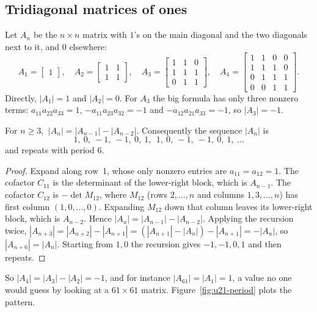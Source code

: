\subsection{Tridiagonal matrices of ones}

Let $A_n$ be the $n\times n$ matrix with $1$'s on the main diagonal and the two diagonals
next to it, and $0$ elsewhere:
\[
  A_1=\begin{bmatrix}1\end{bmatrix},\quad
  A_2=\begin{bmatrix}1&1\\1&1\end{bmatrix},\quad
  A_3=\begin{bmatrix}1&1&0\\1&1&1\\0&1&1\end{bmatrix},\quad
  A_4=\begin{bmatrix}1&1&0&0\\1&1&1&0\\0&1&1&1\\0&0&1&1\end{bmatrix}.
\]
Directly, $|A_1|=1$ and $|A_2|=0$. For $A_3$ the big formula has only three nonzero terms:
$a_{11}a_{22}a_{33}=1$, $-a_{11}a_{23}a_{32}=-1$ and $-a_{12}a_{21}a_{33}=-1$, so $|A_3|=-1$.

\begin{theorem}\label{thm:u21-tridiag}
For $n\ge 3$, $\ |A_n|=|A_{n-1}|-|A_{n-2}|$. Consequently the sequence $|A_n|$ is
\[
  1,\ 0,\ -1,\ -1,\ 0,\ 1,\ \ 1,\ 0,\ -1,\ -1,\ 0,\ 1,\ \dots
\]
and repeats with period $6$.
\end{theorem}

\begin{proof}
Expand along row~1, whose only nonzero entries are $a_{11}=a_{12}=1$. The cofactor $C_{11}$
is the determinant of the lower-right block, which is $A_{n-1}$. The cofactor $C_{12}$ is
$-\det M_{12}$, where $M_{12}$ (rows $2,\dots,n$ and columns $1,3,\dots,n$) has first column
$(1,0,\dots,0)$. Expanding $M_{12}$ down that column leaves its lower-right block, which is
$A_{n-2}$. Hence $|A_n|=|A_{n-1}|-|A_{n-2}|$. Applying the recursion twice,
$|A_{n+3}|=|A_{n+2}|-|A_{n+1}|=(|A_{n+1}|-|A_n|)-|A_{n+1}|=-|A_n|$, so
$|A_{n+6}|=|A_n|$. Starting from $1,0$ the recursion gives $-1,-1,0,1$ and then repeats.
\end{proof}

So $|A_4|=|A_3|-|A_2|=-1$, and for instance $|A_{61}|=|A_1|=1$, a value no one would guess by
looking at a $61\times 61$ matrix. Figure~\ref{fig:u21-period} plots the pattern.

